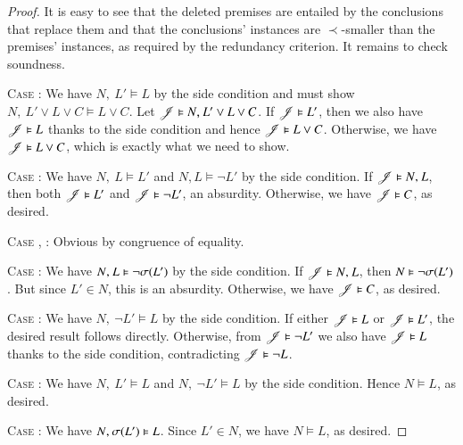 \begin{rep}
\begin{proof}
It is easy to see that the deleted premises are entailed by the conclusions that
replace them and that the conclusions' instances are $\prec$-smaller than the
premises' instances, as required by the redundancy criterion. It remains to
check soundness.

\medskip

\noindent
\textsc{Case} :\enskip
We have $N{,}\> L' \models L$ by the side condition and must show
$N{,}\> L' \lor L \lor C \models L \lor C$. Let
$\mathscr{J} \vDash N{,}\> L' \lor L \lor C$. If $\mathscr{J} \vDash L'$, then
we also have $\mathscr{J} \vDash L$ thanks to the side condition and hence
$\mathscr{J} \vDash L \lor C$. Otherwise, we have $\mathscr{J} \vDash L \lor C$,
which is exactly what we need to show.

\medskip

\noindent
\textsc{Case} :\enskip
We have $N{,}\> L \models L'$ and $N, L \models \lnot L'$ by the side condition.
If $\mathscr{J} \vDash N{,}\> L$, then both $\mathscr{J} \vDash L'$ and
$\mathscr{J} \vDash \lnot L'$, an absurdity.
Otherwise, we have $\mathscr{J} \vDash C$, as desired.

\medskip

\noindent
\textsc{Case} , :\enskip
Obvious by congruence of equality.

\medskip

\noindent
\textsc{Case} :\enskip
We have $N{,}\> L \vDash \lnot \sigma(L')$ by the side condition. If $\mathscr{J}
\vDash N{,}\> L$, then $N \vDash \lnot \sigma(L')$. But since $L' \in N$, this is
an absurdity. Otherwise, we have $\mathscr{J} \vDash C$, as desired.

\medskip

\noindent
\textsc{Case} :\enskip
We have $N{,}\> \lnot L' \models L$ by the side condition. If either $\mathscr{J}
\vDash L$ or $\mathscr{J} \vDash L'$, the desired result follows directly.
Otherwise, from $\mathscr{J} \vDash \lnot L'$ we also have $\mathscr{J} \vDash L$
thanks to the side condition, contradicting $\mathscr{J} \vDash \lnot L$.

\medskip

\noindent
\textsc{Case} :\enskip
We have $N{,}\> L' \models L$ and $N{,}\> \lnot L' \models L$ by the side condition.
Hence $N \models L$, as desired.

\medskip

\noindent
\textsc{Case} :\enskip
We have $N{,}\> \sigma(L') \vDash L$. Since $L' \in N$, we have $N \models L$,
as desired.
\qedhere
\end{proof}
\end{rep}

